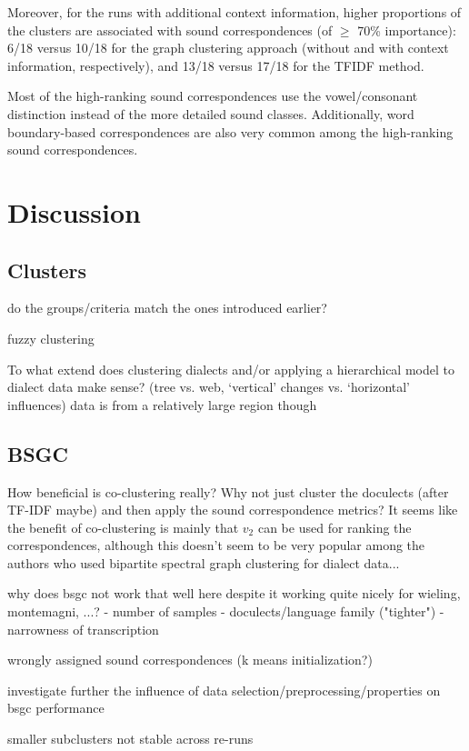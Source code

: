 \documentclass[a4paper]{article}
\begin{document}
Moreover, for the runs with additional context information,
higher proportions of the clusters are associated with
sound correspondences (of $\geq$ 70\% importance):
6/18 versus 10/18 for the graph clustering approach
(without and with context information, respectively),
and 13/18 versus 17/18 for the TFIDF method.

Most of the high-ranking sound correspondences
use the vowel/consonant distinction instead of
the more detailed sound classes.
Additionally, word boundary-based correspondences are also very common
among the high-ranking sound correspondences.

\section{Discussion}
\label{sec:discussion}

\subsection{Clusters}
do the groups/criteria match the ones introduced earlier?

fuzzy clustering

To what extend does clustering dialects and/or applying a hierarchical model to dialect data make sense? (tree vs. web, `vertical' changes vs. `horizontal' influences)
data is from a relatively large region though


\subsection{BSGC}
How beneficial is co-clustering really? Why not just cluster the doculects (after TF-IDF maybe) and then apply the sound correspondence metrics? It seems like the benefit of co-clustering is mainly that $v_2$ can be used for ranking the correspondences, although this doesn't seem to be very popular among the authors who used bipartite spectral graph clustering for dialect data...

why does bsgc not work that well here despite it working quite nicely for wieling, montemagni, ...?
- number of samples
- doculects/language family ("tighter")
- narrowness of transcription

wrongly assigned sound correspondences (k means initialization?)

investigate further the influence of data selection/preprocessing/properties on bsgc performance

smaller subclusters not stable across re-runs
\end{document}
